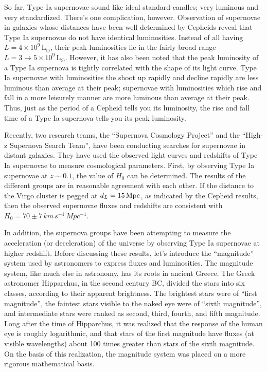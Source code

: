 \documentclass[a4paper,11pt]{article}
\begin{document}
{\noindent}So far, Type Ia supernovae sound like ideal standard candles; very luminous and very standardized. There’s one complication, however. Observation of supernovae in galaxies whose distances have been well determined by Cepheids reveal that Type Ia supernovae do not have identical luminosities. Instead of all having $L = 4\times10^9\,\mathrm{L}_\odot$, their peak luminosities lie in the fairly broad range $L = 3\rightarrow5\times10^9\,\mathrm{L}_\odot$. However, it has also been noted that the peak luminosity of a Type Ia supernova is tightly correlated with the shape of its light curve. Type Ia supernovae with luminosities the shoot up rapidly and decline rapidly are less luminous than average at their peak; supernovae with luminosities which rise and fall in a more leisurely manner are more luminous than average at their peak. Thus, just as the period of a Cepheid tells you its luminosity, the rise and fall time of a Type Ia supernova tells you its peak luminosity.

{\noindent}Recently, two research teams, the ``Supernova Cosmology Project'' and the ``High-z Supernova Search Team'', have been conducting searches for supernovae in distant galaxies. They have used the observed light curves and redshifts of Type Ia supernovae to measure cosmological parameters. First, by observing Type Ia supernovae at $z\sim0.1$, the value of $H_0$ can be determined. The results of the different groups are in reasonable agreement with each other. If the distance to the Virgo cluster is pegged at $d_L = 15\,{\rm Mpc}$, as indicated by the Cepheid results, then the observed supernovae fluxes and redshifts are consistent with $H_0 = 70\pm7\,{km\,s^{-1}\,Mpc^{-1}}$.

{\noindent}In addition, the supernova groups have been attempting to measure the acceleration (or deceleration) of the universe by observing Type Ia supernovae at higher redshift. Before discussing these results, let's introduce the ``magnitude'' system used by astronomers to express fluxes and luminosities. The magnitude system, like much else in astronomy, has its roots in ancient Greece. The Greek astronomer Hipparchus, in the second century BC, divided the stars into six classes, according to their apparent brightness. The brightest stars were of ``first magnitude'', the faintest stars visible to the naked eye were of ``sixth magnitude'', and intermediate stars were ranked as second, third, fourth, and fifth magnitude. Long after the time of Hipparchus, it was realized that the response of the human eye is roughly logarithmic, and that stars of the first magnitude have fluxes (at visible wavelengths) about 100 times greater than stars of the sixth magnitude. On the basis of this realization, the magnitude system was placed on a more rigorous mathematical basis.
\end{document}

